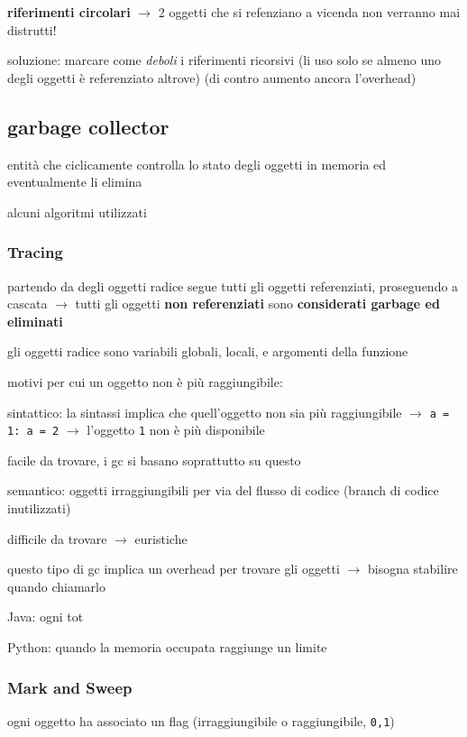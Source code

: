 \textbf{riferimenti circolari} $\rightarrow$ 2 oggetti che si refenziano a vicenda non verranno mai distrutti!

soluzione: marcare come \emph{deboli} i riferimenti ricorsivi (li uso solo se almeno uno degli oggetti \`e referenziato altrove) (di contro aumento ancora l'overhead)

\subsection{garbage collector}

entit\`a che ciclicamente controlla lo stato degli oggetti in memoria ed eventualmente li elimina

alcuni algoritmi utilizzati

\subsubsection{Tracing}

partendo da degli oggetti radice segue tutti gli oggetti referenziati, proseguendo a cascata $\rightarrow$ tutti gli oggetti \textbf{non referenziati} sono \textbf{considerati garbage ed eliminati}

gli oggetti radice sono variabili globali, locali, e argomenti della funzione

motivi per cui un oggetto non \`e pi\`u raggiungibile:

sintattico: la sintassi implica che quell'oggetto non sia pi\`u raggiungibile $\rightarrow$ \texttt{a = 1: a = 2} $\rightarrow$ l'oggetto \texttt{1} non \`e pi\`u disponibile

facile da trovare, i gc si basano soprattutto su questo

semantico: oggetti irraggiungibili per via del flusso di codice (branch di codice inutilizzati)

difficile da trovare $\rightarrow$ euristiche

questo tipo di gc implica un overhead per trovare gli oggetti $\rightarrow$ bisogna stabilire quando chiamarlo

Java: ogni tot

Python: quando la memoria occupata raggiunge un limite

\subsubsection{Mark and Sweep}

ogni oggetto ha associato un flag (irraggiungibile o raggiungibile, \texttt{0,1})

